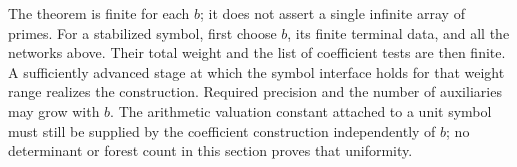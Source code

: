 The theorem is finite for each $b$; it does not assert a single infinite
array of primes.  For a stabilized symbol, first choose $b$, its finite
terminal data, and all the networks above.  Their total weight and the
list of coefficient tests are then finite.  A sufficiently advanced
stage at which the symbol interface holds for that weight range
realizes the construction.  Required precision and the number of
auxiliaries may grow with $b$.  The arithmetic valuation constant
attached to a unit symbol must still be supplied by the coefficient
construction independently of $b$; no determinant or forest count in
this section proves that uniformity.
